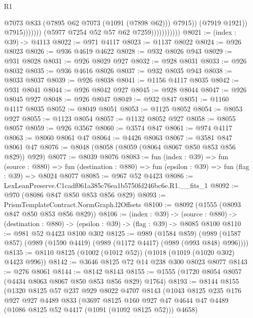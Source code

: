 \begin{lexlean}{R1}
\begin{coremodule}
                                            @7073
                                            @833
                                            (@7895 @62 @7073 (@1091 (@7898 @62)))
                                            @7915))
                                        (@7919 @1921))
                                      @7915)))))))
                        (@5977 @7254 @52 @57 @62 @7259)))))))))))
@8021 := (index : @39) -> @4113
@8022 := @971 @4117
@8023 := @1137 @8022
@8024 := @926 @8023
@8026 := @936 @4619 @4622
@8028 := @932 @8026 @943
@8029 := @931 @8028
@8031 := @926 @8029 @927
@8032 := @928 @8031
@8033 := @926 @8032
@8035 := @936 @4616 @8026
@8037 := @932 @8035 @943
@8038 := @8033 @8037
@8039 := @926 @8038
@8041 := @1156 @4117 @8035
@8042 := @931 @8041
@8044 := @926 @8042 @927
@8045 := @928 @8044
@8047 := @926 @8045 @927
@8048 := @926 @8047
@8049 := @932 @847
@8051 := @1160 @4117 @8035
@8052 := @8049 @8051
@8053 := @1125 @8052
@8054 := @8053 @927
@8055 := @1123 @8054
@8057 := @1132 @8052 @927
@8058 := @8055 @8057
@8059 := @926 @3567
@8060 := @3574 @847
@8061 := @974 @4117
@8063 := @8060 @8061 @47
@8064 := @4426 @8063
@8067 := @3581 @847 @8061 @47
@8076 := @8048 (@8058 (@8059 (@8064 @8067 @850 @853 @856 @829)) @929)
@8077 := @8039 @8076
@8083 := fun (index : @39) =>
  fun (source : @880) =>
  fun (destination : @880) => fun (epsilon : @39) => fun (flag : @39) => @8024 @8077
@8085 := @967 @52 @4423
@8086 := LexLeanPreserve.C1cadf061a385c76ea1b5750fd246bc6e.R1.__fits_1
@8092 := @970 (@8086 @847 @850 @853 @856 @829)
@8093 := PrismTemplateContract.NormGraph.l2Offsets
@8100 := @8092 (@1555 (@8093 @847 @850 @853 @856 @829))
@8106 := (index : @39) ->
  (source : @880) -> (destination : @880) -> (epsilon : @39) -> (flag : @39) -> @8085 @8100
@8110 := @981 @52 @4423 @8100 @302
@8125 := @989
    (@1584 @859)
    (@989 (@1587 @857) (@989 (@1590 @4419) (@989 (@1172 @4417) (@989 (@993 @848) @996))))
@8135 := @8110 @8125 (@1002 (@1012 @52)) (@1018 (@1019 (@1020 @302) @4423 @996))
@8142 := @3646 @8125 @72 @14 @238 @300 @8023 @8077
@8143 := @276 @8061
@8144 := @8142 @8143
@8155 := @1555 (@1720 @8054 @8057 (@4434 @8063 @8067 @850 @853 @856 @829) @1764)
@8193 := @8144
    @8155
    (@1320
      @8125
      @57
      @237
      @929
      @8022
      @4707
      @8143
      (@1043
        @8125
        @235
        @176
        @927
        @927
        @4489
        @833
        (@3697
          @8125
          @160
          @927
          @47
          @4644
          @47
          @4489
          (@1086 @8125 @52 @4417 (@1091 (@1092 @8125 @52)))
          @4658)

\end{coremodule}
\end{lexlean}
